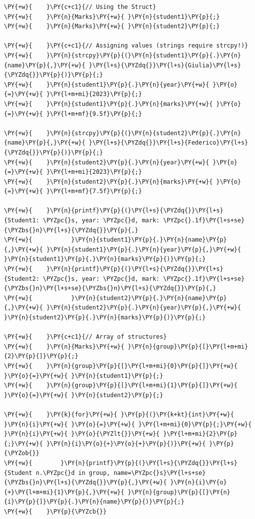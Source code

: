 \begin{Verbatim}[label=\makebox{\url{https://github.com/lucabaldini/cmepda/tree/master/slides/latex/snippets/typedef_and_structs.c}},commandchars=\\\{\}]
\PY{+w}{    }\PY{c+c1}{// Using the Struct}
\PY{+w}{    }\PY{n}{Marks}\PY{+w}{ }\PY{n}{student1}\PY{p}{;}
\PY{+w}{    }\PY{n}{Marks}\PY{+w}{ }\PY{n}{student2}\PY{p}{;}

\PY{+w}{    }\PY{c+c1}{// Assigning values (strings require strcpy!)}
\PY{+w}{    }\PY{n}{strcpy}\PY{p}{(}\PY{n}{student1}\PY{p}{.}\PY{n}{name}\PY{p}{,}\PY{+w}{ }\PY{l+s}{\PYZdq{}}\PY{l+s}{Giulia}\PY{l+s}{\PYZdq{}}\PY{p}{)}\PY{p}{;}
\PY{+w}{    }\PY{n}{student1}\PY{p}{.}\PY{n}{year}\PY{+w}{ }\PY{o}{=}\PY{+w}{ }\PY{l+m+mi}{2023}\PY{p}{;}
\PY{+w}{    }\PY{n}{student1}\PY{p}{.}\PY{n}{marks}\PY{+w}{ }\PY{o}{=}\PY{+w}{ }\PY{l+m+mf}{9.5f}\PY{p}{;}

\PY{+w}{    }\PY{n}{strcpy}\PY{p}{(}\PY{n}{student2}\PY{p}{.}\PY{n}{name}\PY{p}{,}\PY{+w}{ }\PY{l+s}{\PYZdq{}}\PY{l+s}{Federico}\PY{l+s}{\PYZdq{}}\PY{p}{)}\PY{p}{;}
\PY{+w}{    }\PY{n}{student2}\PY{p}{.}\PY{n}{year}\PY{+w}{ }\PY{o}{=}\PY{+w}{ }\PY{l+m+mi}{2023}\PY{p}{;}
\PY{+w}{    }\PY{n}{student2}\PY{p}{.}\PY{n}{marks}\PY{+w}{ }\PY{o}{=}\PY{+w}{ }\PY{l+m+mf}{7.5f}\PY{p}{;}

\PY{+w}{    }\PY{n}{printf}\PY{p}{(}\PY{l+s}{\PYZdq{}}\PY{l+s}{Student1: \PYZpc{}s, year: \PYZpc{}d, mark: \PYZpc{}.1f}\PY{l+s+se}{\PYZbs{}n}\PY{l+s}{\PYZdq{}}\PY{p}{,}
\PY{+w}{           }\PY{n}{student1}\PY{p}{.}\PY{n}{name}\PY{p}{,}\PY{+w}{ }\PY{n}{student1}\PY{p}{.}\PY{n}{year}\PY{p}{,}\PY{+w}{ }\PY{n}{student1}\PY{p}{.}\PY{n}{marks}\PY{p}{)}\PY{p}{;}
\PY{+w}{    }\PY{n}{printf}\PY{p}{(}\PY{l+s}{\PYZdq{}}\PY{l+s}{Student2: \PYZpc{}s, year: \PYZpc{}d, mark: \PYZpc{}.1f}\PY{l+s+se}{\PYZbs{}n}\PY{l+s+se}{\PYZbs{}n}\PY{l+s}{\PYZdq{}}\PY{p}{,}
\PY{+w}{           }\PY{n}{student2}\PY{p}{.}\PY{n}{name}\PY{p}{,}\PY{+w}{ }\PY{n}{student2}\PY{p}{.}\PY{n}{year}\PY{p}{,}\PY{+w}{ }\PY{n}{student2}\PY{p}{.}\PY{n}{marks}\PY{p}{)}\PY{p}{;}

\PY{+w}{    }\PY{c+c1}{// Array of structures}
\PY{+w}{    }\PY{n}{Marks}\PY{+w}{ }\PY{n}{group}\PY{p}{[}\PY{l+m+mi}{2}\PY{p}{]}\PY{p}{;}
\PY{+w}{    }\PY{n}{group}\PY{p}{[}\PY{l+m+mi}{0}\PY{p}{]}\PY{+w}{ }\PY{o}{=}\PY{+w}{ }\PY{n}{student1}\PY{p}{;}
\PY{+w}{    }\PY{n}{group}\PY{p}{[}\PY{l+m+mi}{1}\PY{p}{]}\PY{+w}{ }\PY{o}{=}\PY{+w}{ }\PY{n}{student2}\PY{p}{;}

\PY{+w}{    }\PY{k}{for}\PY{+w}{ }\PY{p}{(}\PY{k+kt}{int}\PY{+w}{ }\PY{n}{i}\PY{+w}{ }\PY{o}{=}\PY{+w}{ }\PY{l+m+mi}{0}\PY{p}{;}\PY{+w}{ }\PY{n}{i}\PY{+w}{ }\PY{o}{\PYZlt{}}\PY{+w}{ }\PY{l+m+mi}{2}\PY{p}{;}\PY{+w}{ }\PY{n}{i}\PY{o}{+}\PY{o}{+}\PY{p}{)}\PY{+w}{ }\PY{p}{\PYZob{}}
\PY{+w}{        }\PY{n}{printf}\PY{p}{(}\PY{l+s}{\PYZdq{}}\PY{l+s}{Student n.\PYZpc{}d in group, name=\PYZpc{}s}\PY{l+s+se}{\PYZbs{}n}\PY{l+s}{\PYZdq{}}\PY{p}{,}\PY{+w}{ }\PY{n}{i}\PY{o}{+}\PY{l+m+mi}{1}\PY{p}{,}\PY{+w}{ }\PY{n}{group}\PY{p}{[}\PY{n}{i}\PY{p}{]}\PY{p}{.}\PY{n}{name}\PY{p}{)}\PY{p}{;}
\PY{+w}{    }\PY{p}{\PYZcb{}}


\end{Verbatim}
